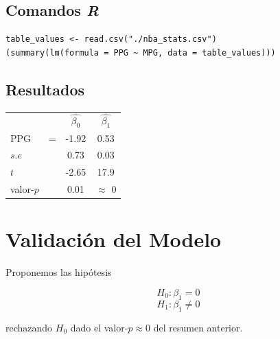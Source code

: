 \documentclass[onecolumn]{IEEEtran}
\begin{document}
    \subsection*{Comandos \textit{R}}
    \begin{verbatim}
table_values <- read.csv("./nba_stats.csv")
(summary(lm(formula = PPG ~ MPG, data = table_values)))
    \end{verbatim}
    \newpage
    \subsection*{Resultados}
    \begin{table}[h]
        \centering
        \begin{tabular}{l l c c}
            & & $\hat{\beta_0}$ & $\hat{\beta_1}$ \\
            PPG & = & -1.92 & 0.53 \\
            $s.e$ &  & 0.73 & 0.03 \\
            $t$ & & -2.65 & 17.9 \\
            valor-$p$ & & 0.01 & $\approx$ 0
        \end{tabular}
    \end{table}
    
    \section{Validaci\'on del Modelo}
    Proponemos las hip\'otesis
    
    $$
        H_0 : \beta_1 = 0
    $$
    $$
        H_1 : \beta_1 \neq 0
    $$

    rechazando $H_0$ dado el valor-$p \approx 0$ del resumen anterior.
\end{document}
